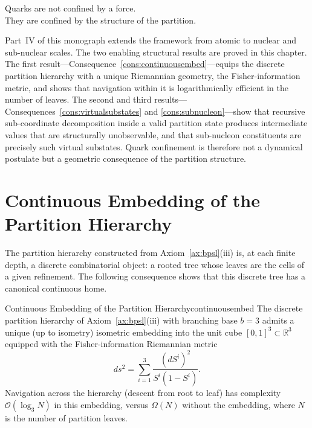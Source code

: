 
\epigraph{%
  Quarks are not confined by a force.\\
  They are confined by the structure of the partition.%
}{}

Part~IV of this monograph extends the framework from atomic to nuclear and
sub-nuclear scales.  The two enabling structural results are proved in this
chapter.  The first result---Consequence~\ref{cons:continuousembed}---equips
the discrete partition hierarchy with a unique Riemannian geometry, the
Fisher-information metric, and shows that navigation within it is
logarithmically efficient in the number of leaves.  The second and third
results---Consequences~\ref{cons:virtualsubstates} and
\ref{cons:subnucleon}---show that recursive sub-coordinate decomposition
inside a valid partition state produces intermediate values that are
structurally unobservable, and that sub-nucleon constituents are precisely
such virtual substates.  Quark confinement is therefore not a dynamical
postulate but a geometric consequence of the partition structure.

\section{Continuous Embedding of the Partition Hierarchy}
\label{sec:continuousemb}

The partition hierarchy constructed from Axiom~\ref{ax:bpsl}(iii) is, at
each finite depth, a discrete combinatorial object: a rooted tree whose
leaves are the cells of a given refinement.  The following consequence shows
that this discrete tree has a canonical continuous home.

\begin{consequence}{Continuous Embedding of the Partition Hierarchy}{continuousembed}
The discrete partition hierarchy of Axiom~\ref{ax:bpsl}(iii) with
branching base $b=3$ admits a unique (up to isometry) isometric embedding
into the unit cube $[0,1]^{3}\subset\mathbb{R}^{3}$ equipped with the
Fisher-information Riemannian metric
\begin{equation}
  ds^{2}=\sum_{i=1}^{3}\frac{(dS^{i})^{2}}{S^{i}(1-S^{i})}.
  \label{eq:fishermetric}
\end{equation}
Navigation across the hierarchy (descent from root to leaf) has complexity
$\mathcal{O}(\log_{3}N)$ in this embedding, versus $\Omega(N)$ without the
embedding, where $N$ is the number of partition leaves.
\end{consequence}

